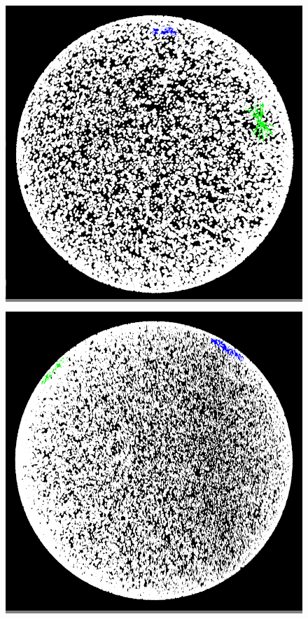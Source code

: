 \documentclass{article}
\begin{document}
\begin{figure}
\begin{minipage}{0.45\textwidth}
    \colorbox{gray}{\includegraphics[width=\linewidth]{./images/sphere_0.png}}
    \end{minipage}
    \hspace{\fill}
    \begin{minipage}{0.45\textwidth}
    \colorbox{gray}{\includegraphics[width=\linewidth]{./images/sphere_1.png}}

\end{minipage}
\end{figure}
\end{document}
